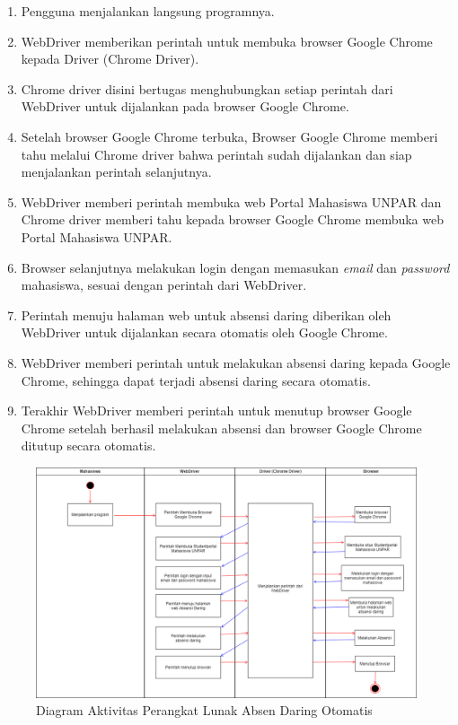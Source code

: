 \begin{enumerate}
	\item Pengguna menjalankan langsung programnya.
	\item WebDriver memberikan perintah untuk membuka browser Google Chrome kepada Driver (Chrome Driver).
	\item Chrome driver disini bertugas menghubungkan setiap perintah dari WebDriver untuk dijalankan pada browser Google Chrome.
	\item Setelah browser Google Chrome terbuka, Browser Google Chrome memberi tahu melalui Chrome driver bahwa perintah sudah dijalankan dan siap menjalankan perintah selanjutnya.
	\item WebDriver memberi perintah membuka web Portal Mahasiswa UNPAR dan Chrome driver memberi tahu kepada browser Google Chrome membuka web Portal Mahasiswa UNPAR.
	\item Browser selanjutnya melakukan login dengan memasukan \textit{email} dan \textit{password} mahasiswa, sesuai dengan perintah dari WebDriver.
	\item Perintah menuju halaman web untuk absensi daring diberikan oleh WebDriver untuk dijalankan secara otomatis oleh Google Chrome.
	\item WebDriver memberi perintah untuk melakukan absensi daring kepada Google Chrome, sehingga dapat terjadi absensi daring secara otomatis.  
	\item Terakhir WebDriver memberi perintah untuk menutup browser Google Chrome setelah berhasil melakukan absensi dan browser Google Chrome ditutup secara otomatis.
\end{enumerate}
\begin{figure}[H]
	\centering
	\includegraphics[scale=0.3]{Gambar/ActivityAplikasi.png}
	\caption{Diagram Aktivitas Perangkat Lunak Absen Daring Otomatis} 
	\label{fig:ActivityAplikasi}
\end{figure}

